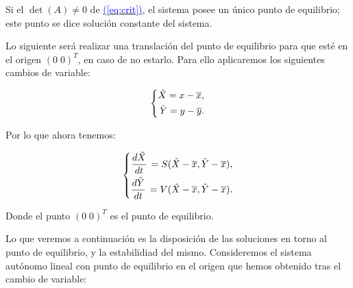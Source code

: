 \documentclass[12pt,a4paper]{report} %
\newcommand{\eref}[1]{\hyperref[#1]{\textcolor{blue}{(\ref*{#1})}}}
\begin{document}
	\noindent Si el $\det(A)\neq0$ de \eref{eq:crit}, el sistema posee un único punto de equilibrio; este punto se dice solución constante del sistema.
    

    
    \vspace{0.5cm}\noindent Lo siguiente será realizar una translación del punto de equilibrio para que esté en el origen $(0\; 0)^T$, en caso de no estarlo. Para ello aplicaremos los siguientes cambios de variable:
    
	\begin{equation}
		\label{eq:trans}
		\scalebox{1}{$\displaystyle
			\left\{
			\begin{aligned}
				\tilde{X}=x-\overline{x}, \\
				\tilde{Y}=y-\overline{y}.
			\end{aligned}
			\right.
			$}
	\end{equation}\smallskip
	
\noindent Por lo que ahora tenemos:
	
	\begin{equation}
		\label{eq:trans2}
		\scalebox{1}{$\displaystyle
			\left\{
			\begin{aligned}
				\frac{d\tilde{X}}{dt}\,=S(\tilde{X}-\overline{x},\tilde{Y}-\overline{x}), \\
				\frac{d\tilde{Y}}{dt}\,=V(\tilde{X}-\overline{x},\tilde{Y}-\overline{x}).
			\end{aligned}
			\right.
			$}
	\end{equation}\smallskip
	
	Donde el punto  $(0\; 0)^T$ es el punto de equilibrio.
	
	\vspace{0.5cm}Lo que veremos a continuación es la disposición de las soluciones en torno al punto de equilibrio, y la estabilidiad del mismo. Consideremos el sistema autónomo lineal con punto de equilibrio en el origen que hemos obtenido tras el cambio de variable:
	
\end{document}
